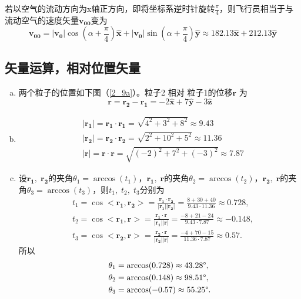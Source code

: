 若以空气的流动方向为x轴正方向，即将坐标系逆时针旋转$ \frac{\pi}{4} $，则飞行员相当于与流动空气的速度矢量$ \bm{v_{00}} $变为
 \[
 \bm{v_{00}} = |\bm{v_0}|\cos(\alpha + \frac{\pi}{4})\bm{\hat{x}} + |\bm{v_0}|\sin(\alpha + \frac{\pi}{4})\bm{\hat{y}} \approx 182.13\bm{\hat{x}} + 212.13\bm{\hat{y}}
 \]

\subsection{矢量运算，相对位置矢量}
\begin{enumerate}[(a)]
	\item
	两个粒子的位置如下图（\ref{2_9a}）。粒子2 相对 粒子1的位移$ \bm{r} $ 为
	\[
	\bm{r} = \bm{r_2} - \bm{r_1} = -2\bm{\hat{x}} + 7\bm{\hat{y}} - 3\bm{\hat{z}}
	\]
	\item
	\[
	\begin{aligned}
	&|\bm{r_1}| = \bm{r_1}\cdot\bm{r_1} = \sqrt{4^2+3^2+8^2} \approx 9.43 \\
	&|\bm{r_2}| = \bm{r_2}\cdot\bm{r_2} = \sqrt{2^2+10^2+5^2} \approx 11.36 \\
	&|\bm{r}| = \bm{r}\cdot\bm{r} = \sqrt{(-2)^2+7^2+(-3)^2} \approx 7.87
\end{aligned}
	\]
	\item
	设$ \bm{r_1},\;\bm{r_2} $的夹角$ \theta_1 = \arccos(t_1)$，$ \bm{r_1},\;\bm{r} $的夹角$ \theta_2 = \arccos(t_2)$，$ \bm{r_2},\;\bm{r} $的夹角$ \theta_3 = \arccos(t_3)$，则$ t_1,\;t_2,\;t_3 $分别为
	\[
	\begin{aligned}
	&t_1 = \cos<\bm{r_1},\bm{r_2}> = \frac{\bm{r_1}\cdot\bm{r_2}}{|\bm{r_1}| |\bm{r_2}|} =  \frac{8+30+40}{9.43\cdot 11.36} \approx 0.728, \\
	&t_2 =  \cos<\bm{r_1},\bm{r}> = \frac{\bm{r_1}\cdot\bm{r}}{|\bm{r_1}| |\bm{r}|} =  \frac{-8+21-24}{9.43\cdot 7.87} \approx -0.148, \\
	&t_3 =  \cos<\bm{r_2},\bm{r}> = \frac{\bm{r_2}\cdot\bm{r}}{|\bm{r_2}| |\bm{r}|} =  \frac{-4+70-15}{11.36\cdot 7.87} \approx 0.57.
\end{aligned}
	\]
	所以
	\[
	\begin{aligned}
	&\theta_1 = \arccos(0.728) \approx 43.28\degree, \\
	&\theta_2 = \arccos(0.148) \approx 98.51\degree, \\
	&\theta_3 = \arccos(-0.57) \approx 55.25\degree.
\end{aligned}
	\]

\end{enumerate}
